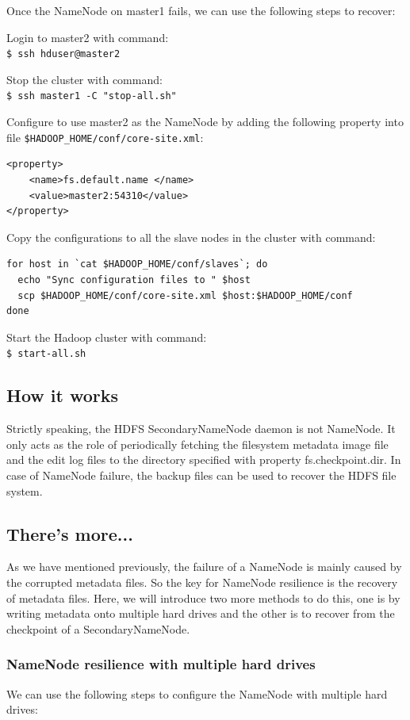 Once the NameNode on master1 fails, we can use the following steps to recover:

Login to master2 with command: \\
\verb|$ ssh hduser@master2|

Stop the cluster with command: \\
\verb|$ ssh master1 -C "stop-all.sh"|

Configure to use master2 as the NameNode by adding the following property into file \verb|$HADOOP_HOME/conf/core-site.xml|:
\begin{verbatim}
<property>
    <name>fs.default.name </name>
    <value>master2:54310</value>
</property>
\end{verbatim}

Copy the configurations to all the slave nodes in the cluster with command:
\begin{verbatim}
for host in `cat $HADOOP_HOME/conf/slaves`; do
  echo "Sync configuration files to " $host
  scp $HADOOP_HOME/conf/core-site.xml $host:$HADOOP_HOME/conf
done
\end{verbatim}

Start the Hadoop cluster with command: \\
\verb|$ start-all.sh|

\subsection*{How it works}
Strictly speaking, the HDFS SecondaryNameNode daemon is not NameNode. It only acts as the role of periodically fetching the filesystem metadata image file and the edit log files to the directory specified with property fs.checkpoint.dir. In case of NameNode failure, the backup files can be used to recover the HDFS file system.

\subsection*{There's more...}
As we have mentioned previously, the failure of a NameNode is mainly caused by the corrupted metadata files. So the key for NameNode resilience is the recovery of metadata files. Here, we will introduce two more methods to do this, one is by writing metadata onto multiple hard drives and the other is to recover from the checkpoint of a SecondaryNameNode.

\subsubsection*{NameNode resilience with multiple hard drives}
We can use the following steps to configure the NameNode with multiple hard drives:\\

